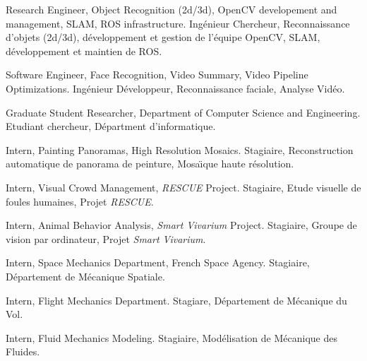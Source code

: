 \documentclass{article}
\begin{document}
\begin{llist}
{
Research Engineer, Object Recognition (2d/3d), OpenCV developement and management, SLAM, ROS infrastructure.
}
{
Ing\'{e}nieur Chercheur, Reconnaissance d'objets (2d/3d), d\'{e}veloppement et gestion de l'\'{e}quipe 
OpenCV, SLAM, d\'{e}veloppement et maintien de ROS.
}

{
Software Engineer, Face Recognition, Video Summary, Video Pipeline
Optimizations.
}
{
Ing\'{e}nieur D\'{e}veloppeur, Reconnaissance faciale, Analyse
Vid\'{e}o.
}

{
Graduate Student Researcher, Department of Computer Science and Engineering.
}
{
Etudiant chercheur, D\'{e}partment d'informatique.
}

{
Intern, Painting Panoramas, High Resolution Mosaics.
}
{
Stagiaire, Reconstruction automatique de panorama de peinture, Mosa\"{\i}que haute r\'{e}solution.
}

{
Intern, Visual Crowd Management, {\em RESCUE} Project.
}
{
Stagiaire, Etude visuelle de foules humaines, Projet {\em RESCUE}.
}

{
Intern, Animal Behavior Analysis, {\em Smart Vivarium} Project.
}
{
Stagiaire, Groupe de vision par ordinateur, Projet {\em Smart Vivarium}.
}

{
Intern, Space Mechanics Department, French Space Agency.
}
{
Stagiaire, D\'{e}partement de M\'{e}canique Spatiale.
}

 
{
Intern, Flight Mechanics Department.
}
{
Stagiare, D\'{e}partement de M\'{e}canique du Vol.
}

 
{
Intern, Fluid Mechanics Modeling.
}
{
Stagiaire, Mod\'{e}lisation de M\'{e}canique des Fluides.
}


\end{llist}
\end{document}
